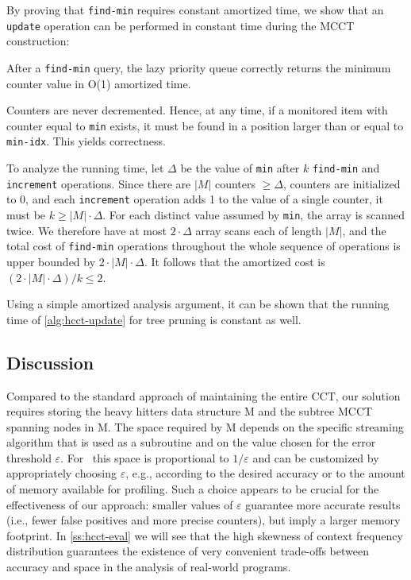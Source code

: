 \ifauthorea{\newline}{}
\noindent By proving that {\tt find-min} requires constant amortized time, we show that an {\tt update} operation can be performed in constant time during the MCCT construction:
\begin{theorem}
After a {\tt find-min} query, the lazy priority queue correctly returns the minimum counter value in O(1) amortized time.
\end{theorem}
\begin{myproof} Counters are never decremented. Hence, at any time, if a monitored item with counter equal to {\tt min} exists, it must be found in a position larger than or equal to {\tt min-idx}. This yields correctness.

To analyze the running time, let $\Delta$ be the value of {\tt min} after $k$ {\tt find-min} and {\tt increment} operations. Since there are $|M|$ counters $\ge\Delta$, counters are initialized to $0$, and each {\tt increment} operation adds 1 to the value of a single counter, it must be $k\ge |M|\cdot\Delta$. For each distinct value assumed by {\tt min}, the array is scanned twice. We therefore have at most $2\cdot\Delta$ array scans each of length $|M|$, and the total cost of {\tt find-min} operations throughout the whole sequence of operations is upper bounded by $2\cdot|M|\cdot\Delta$. It follows that the amortized cost is $(2\cdot|M|\cdot\Delta)/k\leq 2$.
\end{myproof}

\noindent Using a simple amortized analysis argument, it can be shown that the running time of \myalgorithm\ref{alg:hcct-update} for tree pruning is constant as well.


\subsection{Discussion}

Compared to the standard approach of maintaining the entire CCT, our solution requires storing the heavy hitters data structure M and the subtree MCCT spanning nodes in M. The space required by M depends on the specific streaming algorithm that is used as a subroutine and on the value chosen for the error threshold $\varepsilon$. For \spacesaving\, this space is proportional to $1/\varepsilon$ and can be customized by appropriately choosing $\varepsilon$, e.g., according to the desired accuracy or to the amount of memory available for profiling. Such a choice appears to be crucial for the effectiveness of our approach: smaller values of $\varepsilon$ guarantee more accurate results (i.e., fewer false positives and more precise counters), but imply a larger memory footprint. In \mysection\ref{ss:hcct-eval} we will see that the high skewness of context frequency distribution guarantees the existence of very convenient trade-offs between accuracy and space in the analysis of real-world programs.

